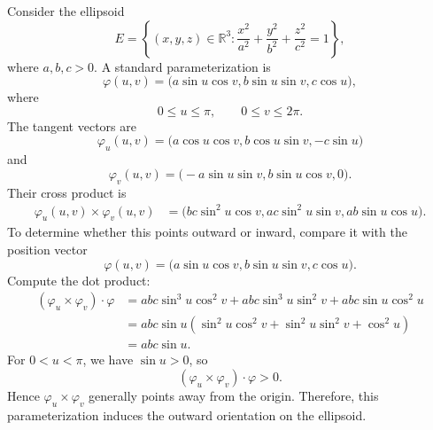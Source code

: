 	\begin{example}
		Consider the ellipsoid
		\begin{equation}
			E =
			\left\{
				(x,y,z) \in \mathbb{R}^3 :
				\frac{x^2}{a^2}
				+
				\frac{y^2}{b^2}
				+
				\frac{z^2}{c^2}
				=
				1
			\right\},
		\end{equation}
		where $a,b,c > 0$. A standard parameterization is
		\begin{equation}
			\varphi(u,v)
			=
			\big(
				a\sin u \cos v,
				b\sin u \sin v,
				c\cos u
			\big),
		\end{equation}
		where
		\begin{equation}
			0 \leq u \leq \pi,
			\qquad
			0 \leq v \leq 2\pi.
		\end{equation}
		The tangent vectors are
		\begin{equation}
			\varphi_u(u,v)
			=
			\big(
				a\cos u \cos v,
				b\cos u \sin v,
				-c\sin u
			\big)
		\end{equation}
		and
		\begin{equation}
			\varphi_v(u,v)
			=
			\big(
				-a\sin u \sin v,
				b\sin u \cos v,
				0
			\big).
		\end{equation}
		Their cross product is
		\begin{align}
			\varphi_u(u,v) \times \varphi_v(u,v)
			&=
			\big(
				bc\sin^2 u \cos v,
				ac\sin^2 u \sin v,
				ab\sin u \cos u
			\big).
		\end{align}
		To determine whether this points outward or inward, compare it with the
		position vector
		\begin{equation}
			\varphi(u,v)
			=
			\big(
				a\sin u \cos v,
				b\sin u \sin v,
				c\cos u
			\big).
		\end{equation}
		Compute the dot product:
		\begin{align}
			\left(\varphi_u \times \varphi_v\right) \cdot \varphi
			&=
			abc\sin^3 u \cos^2 v
			+
			abc\sin^3 u \sin^2 v
			+
			abc\sin u \cos^2 u \\
			&=
			abc\sin u
			\left(
				\sin^2 u \cos^2 v
				+
				\sin^2 u \sin^2 v
				+
				\cos^2 u
			\right) \\
			&=
			abc\sin u.
		\end{align}
		For $0<u<\pi$, we have $\sin u>0$, so
		\begin{equation}
			\left(\varphi_u \times \varphi_v\right) \cdot \varphi > 0.
		\end{equation}
		Hence $\varphi_u \times \varphi_v$ generally points away from the origin.
		Therefore, this parameterization induces the outward orientation on the
		ellipsoid.
			

\end{example}
